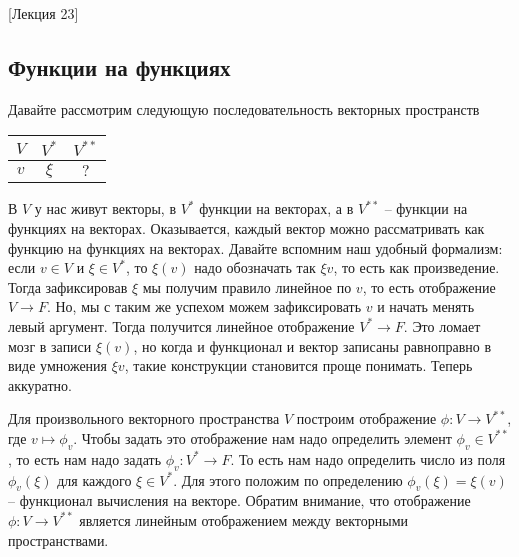 [Лекция 23]


\subsection{Функции на функциях}

Давайте рассмотрим следующую последовательность векторных пространств
\begin{center}
\begin{tabular}{c|c|c}

{$V$}&{$V^*$}&{$V^{**}$}\\

\hline

{$v$}&{$\xi$}&{$?$}\\

\end{tabular}
\end{center}
В $V$ у нас живут векторы, в $V^*$ функции на векторах, а в $V^{**}$ -- функции на функциях на векторах.
Оказывается, каждый вектор можно рассматривать как функцию на функциях на векторах.
Давайте вспомним наш удобный формализм: если $v\in V$ и $\xi \in V^*$, то $\xi(v)$ надо обозначать так $\xi v$, то есть как произведение.
Тогда зафиксировав $\xi$ мы получим правило линейное по $v$, то есть отображение $V\to F$.
Но, мы с таким же успехом можем зафиксировать $v$ и начать менять левый аргумент.
Тогда получится линейное отображение $V^* \to F$.
Это ломает мозг в записи $\xi(v)$, но когда и функционал и вектор записаны равноправно в виде умножения $\xi v$, такие конструкции становится проще понимать.
Теперь аккуратно.

Для произвольного векторного пространства $V$ построим отображение $\phi\colon V\to V^{**}$, где $v\mapsto \phi_v$.
Чтобы задать это отображение нам надо определить элемент $\phi_v\in V^{**}$, то есть нам надо задать $\phi_v\colon V^*\to F$.
То есть нам надо определить число из поля $\phi_v(\xi)$ для каждого $\xi\in V^*$.
Для этого положим по определению $\phi_v(\xi) = \xi(v)$ -- функционал вычисления на векторе.
Обратим внимание, что отображение $\phi\colon V\to V^{**}$ является линейным отображением между векторными пространствами.

